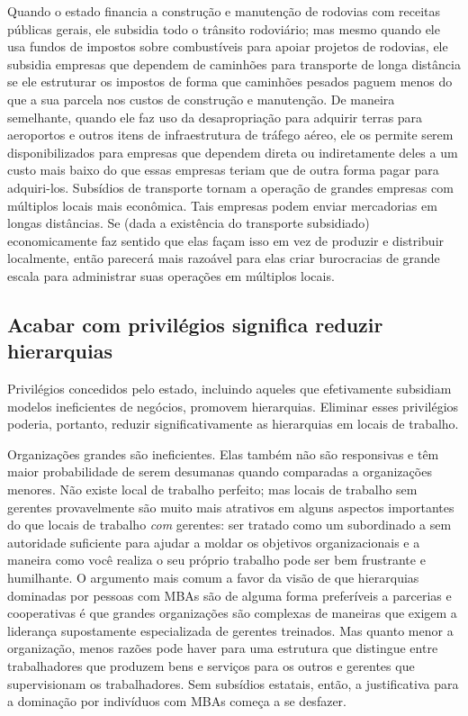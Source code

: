 Quando o estado financia a construção e manutenção de rodovias com receitas públicas gerais, ele subsidia todo o trânsito rodoviário; mas mesmo quando ele usa fundos de impostos sobre combustíveis para apoiar projetos de rodovias, ele subsidia empresas que dependem de caminhões para transporte de longa distância se ele estruturar os impostos de forma que caminhões pesados paguem menos do que a sua parcela nos custos de construção e manutenção. De maneira semelhante, quando ele faz uso da desapropriação para adquirir terras para aeroportos e outros itens de infraestrutura de tráfego aéreo, ele os permite serem disponibilizados para empresas que dependem direta ou indiretamente deles a um custo mais baixo do que essas empresas teriam que de outra forma pagar para adquiri-los. Subsídios de transporte tornam a operação de grandes empresas com múltiplos locais mais econômica. Tais empresas podem enviar mercadorias em longas distâncias. Se (dada a existência do transporte subsidiado) economicamente faz sentido que elas façam isso em vez de produzir e distribuir localmente, então parecerá mais razoável para elas criar burocracias de grande escala para administrar suas operações em múltiplos locais.

\subsection*{Acabar com privilégios significa reduzir hierarquias}

Privilégios concedidos pelo estado, incluindo aqueles que efetivamente subsidiam modelos ineficientes de negócios, promovem hierarquias. Eliminar esses privilégios poderia, portanto, reduzir significativamente as hierarquias em locais de trabalho.

Organizações grandes são ineficientes. Elas também não são responsivas e têm maior probabilidade de serem desumanas quando comparadas a organizações menores. Não existe local de trabalho perfeito; mas locais de trabalho sem gerentes provavelmente são muito mais atrativos em alguns aspectos importantes do que locais de trabalho \emph{com} gerentes: ser tratado como um subordinado a sem autoridade suficiente para ajudar a moldar os objetivos organizacionais e a maneira como você realiza o seu próprio trabalho pode ser bem frustrante e humilhante. O argumento mais comum a favor da visão de que hierarquias dominadas por pessoas com MBAs são de alguma forma preferíveis a parcerias e cooperativas é que grandes organizações são complexas de maneiras que exigem a liderança supostamente especializada de gerentes treinados. Mas quanto menor a organização, menos razões pode haver para uma estrutura que distingue entre trabalhadores que produzem bens e serviços para os outros e gerentes que supervisionam os trabalhadores. Sem subsídios estatais, então, a justificativa para a dominação por indivíduos com MBAs começa a se desfazer.

